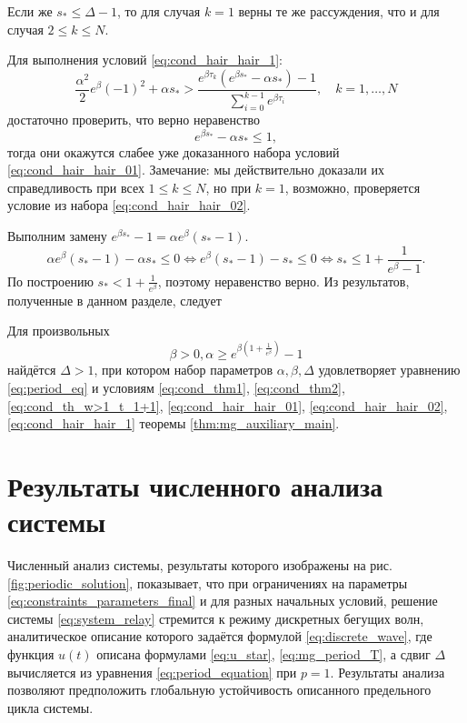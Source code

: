 Если же $s_* \leqslant \Delta - 1$, то для случая $k = 1$ верны те же рассуждения, что и для случая $2 \leqslant k \leqslant N$.

Для выполнения условий \eqref{eq:cond_hair_hair_1}:
\[
\frac{\alpha^2}{2}e^\beta(-1)^2+\alpha s_*>\frac{e^{\beta \tau_k}(e^{\beta s_*}-\alpha s_*)-1}{\sum_{i=0}^{k-1}e^{\beta \tau_i}},\quad k = 1,\ldots, N
\]
достаточно проверить, что верно неравенство
\[
e^{\beta s_*}-\alpha s_* \leqslant 1,
\]
тогда они окажутся слабее уже доказанного набора условий \eqref{eq:cond_hair_hair_01}. Замечание: мы действительно доказали их справедливость при всех $1 \leqslant k \leqslant N$, но при $k = 1$, возможно, проверяется условие из набора \eqref{eq:cond_hair_hair_02}.

Выполним замену $e^{\beta s_*} - 1 = \alpha e^\beta (s_* - 1)$.
%
\[
\alpha e^{\beta}(s_* - 1) - \alpha s_* \leqslant 0 \Leftrightarrow e^{\beta}(s_* - 1) - s_* \leqslant 0 \Leftrightarrow s_* \leqslant 1 + \frac{1}{e^{\beta} - 1}.
\]
%
По построению $s_* < 1 + \frac{1}{e^{\beta}}$, поэтому неравенство верно.
%
Из результатов, полученные в данном разделе, следует
%
\begin{theorem}
	\label{thm:relay_main}
	Для произвольных 
	\begin{equation}
		\label{eq:constraints_parameters_final}
		\beta > 0, \alpha \geq e^{\beta\left(1 + \frac{1}{e^{\beta}}\right)} - 1
	\end{equation}
	найдётся $\Delta > 1$, при котором набор параметров $\alpha, \beta, \Delta$ удовлетворяет уравнению \eqref{eq:period_eq} и условиям \eqref{eq:cond_thm1}, \eqref{eq:cond_thm2}, \eqref{eq:cond_th_w>1_t_1+1}, \eqref{eq:cond_hair_hair_01}, \eqref{eq:cond_hair_hair_02}, \eqref{eq:cond_hair_hair_1} теоремы \ref{thm:mg_auxiliary_main}.
\end{theorem}


\section{Результаты численного анализа системы}\label{sec:ch2/sect4}
%
Численный анализ системы, результаты которого изображены на рис. \ref{fig:periodic_solution}, показывает, что при ограничениях на параметры \eqref{eq:constraints_parameters_final} и для разных начальных условий, решение системы \eqref{eq:system_relay} стремится к режиму дискретных бегущих волн, аналитическое описание которого задаётся формулой \eqref{eq:discrete_wave}, где функция $u(t)$ описана формулами \eqref{eq:u_star}, \eqref{eq:mg_period_T}, а сдвиг $\Delta$ вычисляется из уравнения \eqref{eq:period_equation} при $p = 1$. Результаты анализа позволяют предположить глобальную устойчивость описанного предельного цикла системы.

